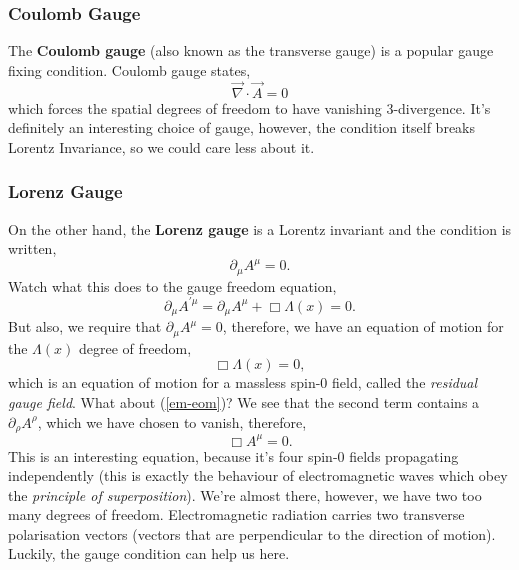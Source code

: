\subsubsection{Coulomb Gauge}
The \textbf{Coulomb gauge} (also known as the transverse gauge) is a popular gauge fixing condition. Coulomb gauge states, 
\begin{equation}
    \vec{\nabla}\cdot\vec{A} = 0
\end{equation}
which forces the spatial degrees of freedom to have vanishing 3-divergence. 
It's definitely an interesting choice of gauge, however, the condition itself breaks Lorentz Invariance, so we could care less about it.

\subsubsection{Lorenz Gauge}
On the other hand, the \textbf{Lorenz gauge} is a Lorentz invariant and the condition is written, 
\begin{equation}
    \partial_{\mu}A^{\mu} = 0.
\end{equation}
Watch what this does to the gauge freedom equation,
\begin{equation}
    \partial_{\mu}A^{'\mu} = \partial_{\mu}A^{\mu} + \Box\Lambda(x) = 0.
\end{equation}
But also, we require that $\partial_{\mu}A^{\mu}=0$, therefore, we have an equation of motion for the $\Lambda(x)$ degree of freedom,
\begin{equation}\nonumber
    \Box\Lambda(x) = 0,
\end{equation}
which is an equation of motion for a massless spin-0 field, called the \textit{residual gauge field}. What about (\ref{em-eom})? We see that the second term contains a $\partial_{\rho}A^{\rho}$, which we have chosen to vanish, therefore, 
\begin{equation}\label{em-eom-reduced}
\Box A^{\mu} = 0.\nonumber
\end{equation}
This is an interesting equation, because it's four spin-0 fields propagating independently (this is exactly the behaviour of electromagnetic waves which obey the \textit{principle of superposition}). We're almost there, however, we have two too many degrees of freedom. Electromagnetic radiation carries two transverse polarisation vectors (vectors that are perpendicular to the direction of motion). Luckily, the gauge condition can help us here. 
